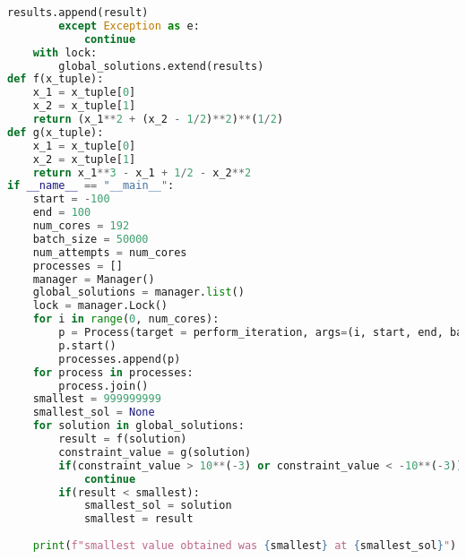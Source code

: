 \documentclass{article}
\begin{document}
\begin{enumerate}[label=\alph*.)]
\begin{lstlisting}[language=Python]
            results.append(result)
        except Exception as e:
            continue
    with lock:
        global_solutions.extend(results)
def f(x_tuple):
    x_1 = x_tuple[0]
    x_2 = x_tuple[1]
    return (x_1**2 + (x_2 - 1/2)**2)**(1/2)
def g(x_tuple):
    x_1 = x_tuple[0]
    x_2 = x_tuple[1]
    return x_1**3 - x_1 + 1/2 - x_2**2
if __name__ == "__main__":
    start = -100
    end = 100
    num_cores = 192
    batch_size = 50000
    num_attempts = num_cores
    processes = []
    manager = Manager()
    global_solutions = manager.list()
    lock = manager.Lock()
    for i in range(0, num_cores):
        p = Process(target = perform_iteration, args=(i, start, end, batch_size, lock, global_solutions))
        p.start()
        processes.append(p)
    for process in processes:
        process.join()
    smallest = 999999999
    smallest_sol = None
    for solution in global_solutions:
        result = f(solution)
        constraint_value = g(solution)
        if(constraint_value > 10**(-3) or constraint_value < -10**(-3)):
            continue
        if(result < smallest):
            smallest_sol = solution
            smallest = result
    
    print(f"smallest value obtained was {smallest} at {smallest_sol}")
\end{lstlisting}
\end{enumerate}
\end{document}
